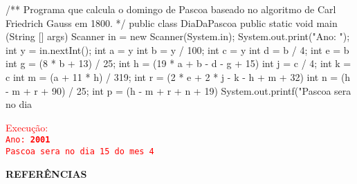 \documentclass[onecolumn,a4paper,10pt]{report}
\newcommand{\+}{\, + \,}
\newcommand{\<}{\hspace*{-0.4cm}}
\begin{document}
\begin{enumerate}[1.]
\begin{javacode}
/**
   Programa que calcula o domingo de Pascoa baseado no
   algoritmo de Carl Friedrich Gauss em 1800.
*/
public class DiaDaPascoa {
    public static void main (String [] args) {
        Scanner in = new Scanner(System.in);
        System.out.print("Ano: ");
        int y = in.nextInt();
        int a = y %
        int b = y / 100;
        int c = y %
        int d = b / 4;
        int e = b %
        int g = (8 * b + 13) / 25;
        int h = (19 * a + b - d - g + 15) %
        int j = c / 4;
        int k = c %
        int m = (a + 11 * h) / 319;
        int r = (2 * e + 2 * j - k - h + m + 32) %
        int n = (h - m + r + 90) / 25;
        int p = (h - m + r + n + 19) %
        System.out.printf("Pascoa sera no dia %
    }
}
\end{javacode}
\textcolor{red}{Execução:\\
\texttt{Ano: \textbf{2001}\\
Pascoa sera no dia 15 do mes 4}
}

\textbf{REFERÊNCIAS}




\end{enumerate}
\end{document}

